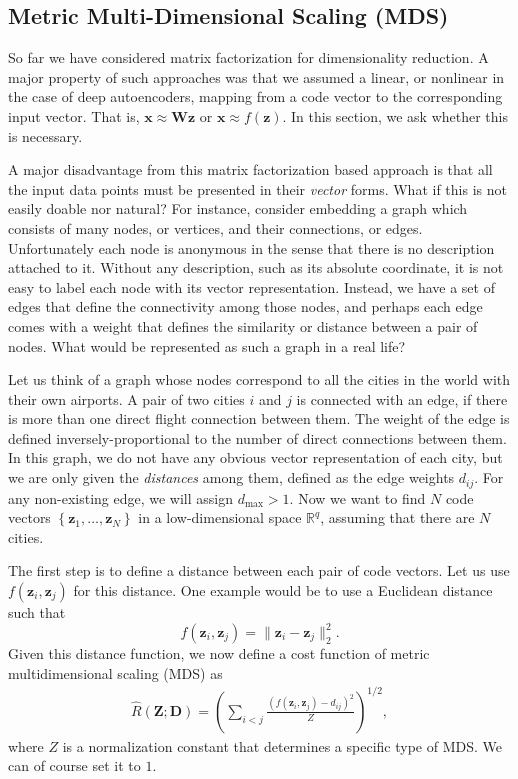 \documentclass{report}
\newcommand{\vect}[1]{\mathbf{#1}}
\newcommand{\matr}[1]{\mathbf{#1}}
\newcommand{\vx}[0]{\vect{x}}
\newcommand{\vz}[0]{\vect{z}}
\newcommand{\mW}[0]{\matr{W}}
\newcommand{\mZ}[0]{\matr{Z}}
\newcommand{\mD}{\matr{D}}
\newcommand{\RR}[0]{\mathbb{R}}
\begin{document}
\subsection{Metric Multi-Dimensional Scaling (MDS)}

So far we have considered matrix factorization for dimensionality reduction. A
major property of such approaches was that we assumed a linear, or nonlinear in
the case of deep autoencoders, mapping from a code vector to the corresponding
input vector. That is, $\vx \approx \mW \vz$ or $\vx \approx f(\vz)$. In this
section, we ask whether this is necessary. 

A major disadvantage from this matrix factorization based approach is that all
the input data points must be presented in their {\it vector} forms. What if
this is not easily doable nor natural? For instance, consider embedding a graph
which consists of many nodes, or vertices, and their connections, or edges.
Unfortunately each node is anonymous in the sense that there is no description
attached to it. Without any description, such as its absolute coordinate, it is
not easy to label each node with its vector representation. Instead, we have a
set of edges that define the connectivity among those nodes, and perhaps each
edge comes with a weight that defines the similarity or distance between a pair
of nodes. What would be represented as such a graph in a real life? 

Let us think of a graph whose nodes correspond to all the cities in the world
with their own airports. A pair of two cities $i$ and $j$ is connected with an
edge, if there is more than one direct flight connection between them. The
weight of the edge is defined inversely-proportional to the number of direct
connections between them. In this graph, we do not have any obvious vector
representation of each city, but we are only given the {\it distances} among
them, defined as the edge weights $d_{ij}$. For any non-existing edge, we will
assign $d_{\max} > 1$.  Now we want to find $N$ code vectors $\left\{ \vz_1,
\ldots, \vz_N \right\}$ in a low-dimensional space $\RR^q$, assuming that there
are $N$ cities. 

The first step is to define a distance between each pair of code vectors. Let us
use $f(\vz_i, \vz_j)$ for this distance. One example would be to use a Euclidean
distance such that
\[
    f(\vz_i, \vz_j) = \| \vz_i - \vz_j \|_2^2.
\]
Given this distance function, we now define a cost function of metric
multidimensional scaling (MDS) as
\begin{align}
    \label{eq:mds}
    \hat{R}(\mZ; \mD) = \left(
        \sum_{i < j} \frac{
            (f(\vz_i, \vz_j) - d_{ij})^2
        }{Z}
    \right)^{1/2},
\end{align}
where $Z$ is a normalization constant that determines a specific type of MDS. We
can of course set it to $1$.
\end{document}
